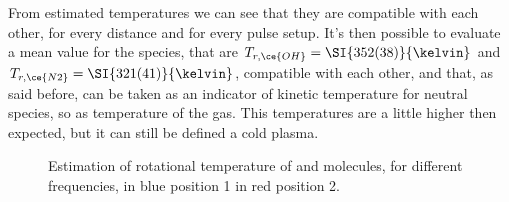 From estimated temperatures we can see that they are compatible with each other, for every distance and for every pulse setup. It's then possible to evaluate a mean value for the species, that are $T_{r,\ce{OH}} = \SI{352(38)}{\kelvin}$ and $T_{r,\ce{N2}} = \SI{321(41)}{\kelvin}$, compatible with each other, and that, as said before, can be taken as an indicator of kinetic temperature for neutral species, so as temperature of the gas. This temperatures are a little higher then expected, but it can still be defined a cold plasma.
\begin{figure}
\centering
  \hfill
 \caption{Estimation of rotational temperature of  and  molecules, for different frequencies, in blue position 1 in red position 2.}
 \label{fig:Trval}
\end{figure}

